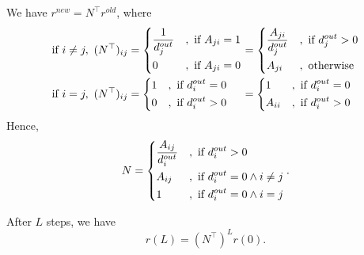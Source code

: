 We have \(r^{new} = N^{\top} r^{old}\), where
\[
	\begin{alignedat}{3}
		&\text{if }i\neq  j,\ (N^{\top})_{ij} = \begin{dcases}
			\frac{1}{d_{j}^{out}} & , \text{ if } A_{ji} = 1 \\
			0                     & , \text{ if } A_{ji} = 0 \\
		\end{dcases} &&= \begin{dcases}
			\frac{A_{ji}}{d_{j}^{out}} & , \text{ if }d_{j}^{out}>0 \\
			A_{ji}                     & , \text{ otherwise}        \\
		\end{dcases}\\
		&\text{if }i = j,\ (N^{\top})_{ij} = \begin{dcases}
			1 & , \text{ if } d_{i}^{out} = 0 \\
			0 & , \text{ if } d_{i}^{out} > 0 \\
		\end{dcases} &&= \begin{dcases}
			1      & , \text{ if } d_{i}^{out} = 0 \\
			A_{ii} & , \text{ if } d_{i}^{out} > 0 \\
		\end{dcases}
	\end{alignedat}
\]
Hence,
\[
	N = \begin{dcases}
		\frac{A_{ij}}{d_{i}^{out}} & , \text{ if } d_{i}^{out}>0                \\
		A_{ij}                     & , \text{ if }d_{i}^{out} = 0 \land i\neq j \\
		1                          & , \text{ if }d_{i}^{out} = 0 \land i= j    \\
	\end{dcases}.
\]

After \(L\) steps, we have
\[
	r(L) = (N^{\top})^L r(0).
\]

